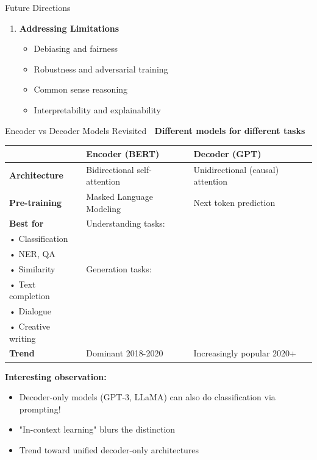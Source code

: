 \documentclass[aspectratio=169]{beamer}
\begin{document}
\begin{frame}[shrink=10]{Future Directions 🔮}
\begin{enumerate}
    \vspace{0.5em}

    \item \textbf{Addressing Limitations}
    \begin{itemize}\setlength{\itemsep}{0pt}
        \item Debiasing and fairness
        \item Robustness and adversarial training
        \item Common sense reasoning
        \item Interpretability and explainability
    \end{itemize}
\end{enumerate}
\end{frame}

\begin{frame}{Encoder vs Decoder Models Revisited 🔄}
\textbf{Different models for different tasks}

\vspace{1em}

\begin{center}
\begin{tabular}{lp{4.5cm}p{4.5cm}}
\toprule
 & \textbf{Encoder (BERT)} & \textbf{Decoder (GPT)} \\
\midrule
\textbf{Architecture} &
Bidirectional self-attention &
Unidirectional (causal) attention \\
\midrule
\textbf{Pre-training} &
Masked Language Modeling &
Next token prediction \\
\midrule
\textbf{Best for} &
Understanding tasks:\\
• Classification\\
• NER, QA\\
• Similarity &
Generation tasks:\\
• Text completion\\
• Dialogue\\
• Creative writing \\
\midrule
\textbf{Trend} &
Dominant 2018-2020 &
Increasingly popular 2020+ \\
\bottomrule
\end{tabular}
\end{center}

\vspace{1em}

\textbf{Interesting observation:}
\begin{itemize}\setlength{\itemsep}{0pt}
    \item Decoder-only models (GPT-3, LLaMA) can also do classification via prompting!
    \item "In-context learning" blurs the distinction
    \item Trend toward unified decoder-only architectures
\end{itemize}
\end{frame}
\end{document}
